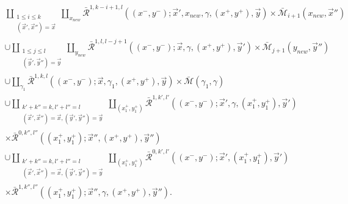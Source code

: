 \documentclass{amsart}
\numberwithin{equation}{section}
\numberwithin{figure}{section}
\begin{document}
\begin{equation}\label{boundary strata of the moduli space of quilted maps defining the bimodule structure maps for Lagrangian immersions}
\begin{split}
&\coprod_{\substack{1 \le i \le k\\ (\vec{x}', \vec{x}'') = \vec{x}}} \coprod_{x_{new}}
\bar{\mathcal{R}}^{1, k-i+1, l}((x^{-}, y^{-}); \vec{x}', x_{new}, \gamma, (x^{+}, y^{+}), \vec{y}) \times \bar{\mathcal{M}}_{i+1}(x_{new}, \vec{x}'')\\
&\cup \coprod_{\substack{1 \le j \le l\\ (\vec{y}', \vec{y}'') = \vec{y}}} \coprod_{y_{new}} \bar{\mathcal{R}}^{1, l, l-j+1}((x^{-}, y^{-}); \vec{x}, \gamma, (x^{+}, y^{+}), \vec{y}') \times \bar{\mathcal{M}}_{j+1}(y_{new}, \vec{y}'')\\
&\cup \coprod_{\gamma_{1}} \bar{\mathcal{R}}^{1, k, l}((x^{-}, y^{-}); \vec{x}, \gamma_{1}, (x^{+}, y^{+}), \vec{y}) \times \bar{\mathcal{M}}(\gamma_{1}, \gamma)\\
&\cup \coprod_{\substack{k'+k''=k, l'+l''=l\\ (\vec{x}', \vec{x}'') = \vec{x}, (\vec{y}', \vec{y}'') = \vec{y}}} \coprod_{(x^{+}_{1}, y^{+}_{1})} \bar{\mathcal{R}}^{1, k', l'}((x^{-}, y^{-}); \vec{x}', \gamma, (x^{+}_{1}, y^{+}_{1}), \vec{y}')\\
&\times \bar{\mathcal{R}}^{0, k'', l''}((x^{+}_{1}, y^{+}_{1}); \vec{x}'', (x^{+}, y^{+}), \vec{y}'')\\
&\cup \coprod_{\substack{k'+k''=k, l'+l''=l\\ (\vec{x}', \vec{x}'') = \vec{x}, (\vec{y}', \vec{y}'') = \vec{y}}} \coprod_{(x^{+}_{1}, y^{+}_{1})} \bar{\mathcal{R}}^{0, k', l'}((x^{-}, y^{-}); \vec{x}', (x^{+}_{1}, y^{+}_{1}), \vec{y}')\\
&\times \bar{\mathcal{R}}^{1, k'', l''}((x^{+}_{1}, y^{+}_{1}); \vec{x}'', \gamma, (x^{+}, y^{+}), \vec{y}'').
\end{split}
\end{equation}
\par
\end{document}
